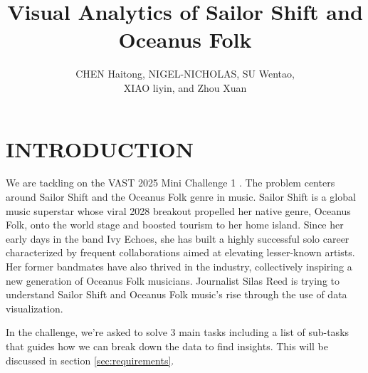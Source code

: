 \documentclass[journal]{vgtc}                     %
\title{Visual Analytics of Sailor Shift and Oceanus Folk}
\author{%
	CHEN Haitong, NIGEL-NICHOLAS, SU Wentao,\\
	XIAO liyin, and Zhou Xuan
}
\begin{document}


\maketitle

\section{INTRODUCTION}
We are tackling on the VAST 2025 Mini Challenge 1 \cite{VASTChallenge2025MC1}. The problem centers around Sailor Shift and the Oceanus Folk genre in music. Sailor Shift is a global music superstar whose viral 2028 breakout propelled her native genre, Oceanus Folk, onto the world stage and boosted tourism to her home island. Since her early days in the band Ivy Echoes, she has built a highly successful solo career characterized by frequent collaborations aimed at elevating lesser-known artists. Her former bandmates have also thrived in the industry, collectively inspiring a new generation of Oceanus Folk musicians. Journalist Silas Reed is trying to understand Sailor Shift and Oceanus Folk music's rise through the use of data visualization.

In the challenge, we're asked to solve 3 main tasks including a list of sub-tasks that guides how we can break down the data to find insights. This will be discussed in section \ref{sec:requirements}.

\end{document}
